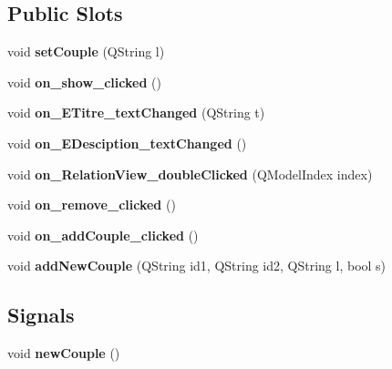 \subsection*{Public Slots}
\begin{DoxyCompactItemize}
\item 
\mbox{\label{class_q_ui_relation_af3d9485700aafc469bd69adb2023d8d4}} 
void {\bfseries set\+Couple} (Q\+String l)
\item 
\mbox{\label{class_q_ui_relation_a66b413fb02bae1c7ce504395655cd47f}} 
void {\bfseries on\+\_\+show\+\_\+clicked} ()
\item 
\mbox{\label{class_q_ui_relation_aa21c9863da04b78e380733a49542c98b}} 
void {\bfseries on\+\_\+\+E\+Titre\+\_\+text\+Changed} (Q\+String t)
\item 
\mbox{\label{class_q_ui_relation_a092e6a03e3ca7b4f6bb061d6b618edb0}} 
void {\bfseries on\+\_\+\+E\+Desciption\+\_\+text\+Changed} ()
\item 
\mbox{\label{class_q_ui_relation_a28751a4ca2c2efb17c12bb45811a4b27}} 
void {\bfseries on\+\_\+\+Relation\+View\+\_\+double\+Clicked} (Q\+Model\+Index index)
\item 
\mbox{\label{class_q_ui_relation_a14fddadaa70fa8c82a0e49a547e2f6b5}} 
void {\bfseries on\+\_\+remove\+\_\+clicked} ()
\item 
\mbox{\label{class_q_ui_relation_a728ef8313c868dd268473db03c358412}} 
void {\bfseries on\+\_\+add\+Couple\+\_\+clicked} ()
\item 
\mbox{\label{class_q_ui_relation_a85b1d8b5dd11254d36eb1a7a1fb0f12d}} 
void {\bfseries add\+New\+Couple} (Q\+String id1, Q\+String id2, Q\+String l, bool s)
\end{DoxyCompactItemize}
\subsection*{Signals}
\begin{DoxyCompactItemize}
\item 
\mbox{\label{class_q_ui_relation_a631d95a38337e49c7d83a201d6fbe5a7}} 
void {\bfseries new\+Couple} ()
\end{DoxyCompactItemize}
